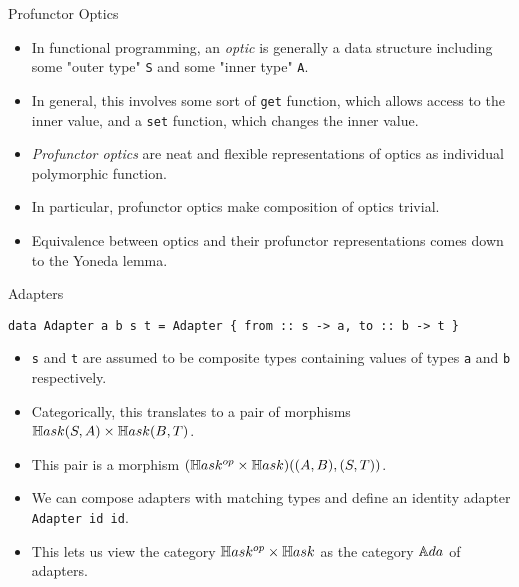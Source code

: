 \begin{frame}[fragile]{Profunctor Optics}
	\begin{itemize}
		\item In functional programming, an \textit{optic} is generally a data structure including some "outer type" \texttt{S} and some "inner type" \texttt{A}.
		\pause\item In general, this involves some sort of \texttt{get} function, which allows access to the inner value, and a \texttt{set} function, which changes the inner value.
		\pause\item \textit{Profunctor optics} are neat and flexible representations of optics as individual polymorphic function.
		\pause\item In particular, profunctor optics make composition of optics trivial.
		\pause\item Equivalence between optics and their profunctor representations comes down to the Yoneda lemma.
	\end{itemize}
\end{frame}
\begin{frame}[fragile]{Adapters}
	\begin{lstlisting}
data Adapter a b s t = Adapter { from :: s -> a, to :: b -> t }
	\end{lstlisting}
	\begin{itemize}
		\item \texttt{s} and \texttt{t} are assumed to be composite types containing values of types \texttt{a} and \texttt{b} respectively.
		\pause\item Categorically, this translates to a pair of morphisms $\mathbb{H}ask(S,A) \times \mathbb{H}ask(B,T)$. 
		\pause\item This pair is a morphism $(\mathbb{H}ask^{op} \times \mathbb{H}ask)((A,B), (S,T))$.
		\pause\item We can compose adapters with matching types and define an identity adapter \texttt{Adapter id id}.
		\pause\item This lets us view the category $\mathbb{H}ask^{op} \times \mathbb{H}ask$ as the category ${\mathbb{A}da}$ of adapters.
	\end{itemize}
\end{frame}
